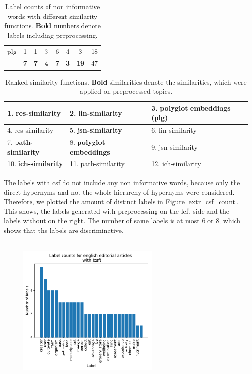 {\begin{table}
\begin{tabular}{c|c|c|c|c|c|c|c}
		\hline
		plg& 1		&1		 &3	   &6      &4       &3 &18\\
		& \textbf{7}&\textbf{7}	 &\textbf{4}  &\textbf{7} &\textbf{3} &\textbf{19} & 47\\
	\end{tabular}
	\caption[Label counts of non informative words]{Label counts of non informative words with different similarity functions. \textbf{Bold} numbers denote labels including preprocessing.}
	\label{tab:label_count_non_informative}
\end{table}
\begin{table}[h]
	\begin{tabular}{|l|l|l|}
		\hline
		1. \textbf{res-similarity} &2. \textbf{lin-similarity} &
		3. polyglot embeddings (plg) \\ 
		\hline
		4. res-similarity&5. \textbf{jsn-similarity}& 6. lin-similarity\\
		\hline
		7. \textbf{path-similarity} &8. \textbf{polyglot embeddings} &9. jsn-similarity \\ 
		\hline
		10. \textbf{ich-similarity}&11. path-similarity  &12. ich-similarity\\
		\hline
	\end{tabular}
\caption[Ranked similarity functions for extrinsic labeling]{Ranked similarity functions. \textbf{Bold} similarities denote the similarities, which were applied on preprocessed topics.}
\label{tab:ranked_non_info}
\end{table}
The labels with \ac{csf} do not include any non informative words, because only the direct hypernyms and not the whole hierarchy of hypernyms were considered. Therefore, we plotted the amount of distinct labels in Figure \ref{extr_csf_count}. This shows, the labels generated with preprocessing on the left side and the labels without on the right. The number of same labels is at most 6 or 8, which shows that the labels are discriminative.
\begin{figure}
	\begin{minipage}{0.5\textwidth}
		\includegraphics[width=7cm,height=7.5cm]{gfx/ATL_sim/with_scoring_pre.pdf}

\end{minipage}
\end{figure}}
